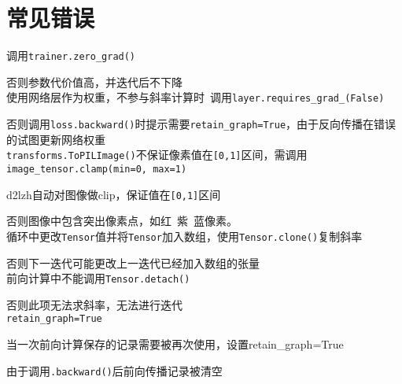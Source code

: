 \documentclass[UTF8]{ctexart}
\begin{document}
\section{常见错误}
\noindent 调用\texttt{trainer.zero\_grad()}

  否则参数代价值高，并迭代后不下降\\
使用网络层作为权重，不参与斜率计算时\ 调用\texttt{layer.requires\_grad\_(False)}

  否则调用\texttt{loss.backward()}时提示需要\texttt{retain\_graph=True}，由于反向传播在错误的试图更新网络权重\\
\texttt{transforms.ToPILImage()}不保证像素值在\texttt{[0,1]}区间，需调用\texttt{image\_tensor.clamp(min=0, max=1)}

  d2lzh自动对图像做clip，保证值在\texttt{[0,1]}区间
  
  否则图像中包含突出像素点，如红\ 紫\ 蓝像素。\\
循环中更改\texttt{Tensor}值并将\texttt{Tensor}加入数组，使用\texttt{Tensor.clone()}复制斜率

  否则下一迭代可能更改上一迭代已经加入数组的张量\\
前向计算中不能调用\texttt{Tensor.detach()}

  否则此项无法求斜率，无法进行迭代\\
\texttt{retain\_graph=True}

  当一次前向计算保存的记录需要被再次使用，设置retain\_graph=True 

  由于调用\texttt{.backward()}后前向传播记录被清空
\end{document}
